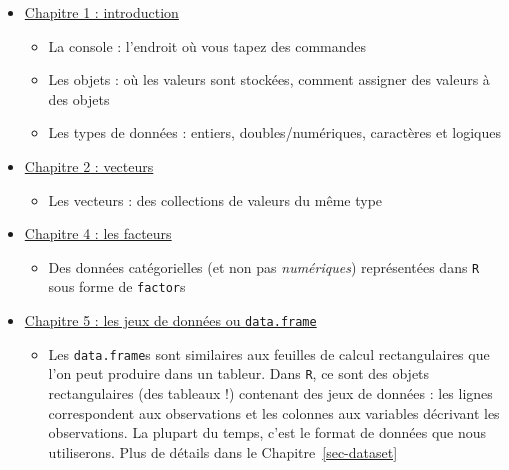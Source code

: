 \documentclass[
  a4paper,
  DIV=11,
  numbers=noendperiod,
  oneside]{scrreprt}
\providecommand{\tightlist}{%
  \setlength{\itemsep}{0pt}\setlength{\parskip}{0pt}}\usepackage{longtable,booktabs,array}
\begin{document}
\begin{itemize}
\tightlist
\item
  \href{https://campus.datacamp.com/courses/introduction-a-r/chapitre-1-introduction?ex=1}{Chapitre
  1 : introduction}

  \begin{itemize}
  \tightlist
  \item
    La console : l'endroit où vous tapez des commandes
  \item
    Les objets : où les valeurs sont stockées, comment assigner des
    valeurs à des objets
  \item
    Les types de données : entiers, doubles/numériques, caractères et
    logiques
  \end{itemize}
\item
  \href{https://campus.datacamp.com/courses/introduction-a-r/chapitre-2-les-vecteurs?ex=1}{Chapitre
  2 : vecteurs}

  \begin{itemize}
  \tightlist
  \item
    Les vecteurs : des collections de valeurs du même type
  \end{itemize}
\item
  \href{https://campus.datacamp.com/courses/introduction-a-r/chapitre-4-facteurs?ex=1}{Chapitre
  4 : les facteurs}

  \begin{itemize}
  \tightlist
  \item
    Des données catégorielles (et non pas \emph{numériques})
    représentées dans \texttt{R} sous forme de \texttt{factor}s
  \end{itemize}
\item
  \href{https://campus.datacamp.com/courses/introduction-a-r/chapitre-5-les-jeux-de-donnees?ex=1}{Chapitre
  5 : les jeux de données ou \texttt{data.frame}}

  \begin{itemize}
  \tightlist
  \item
    Les \texttt{data.frame}s sont similaires aux feuilles de calcul
    rectangulaires que l'on peut produire dans un tableur. Dans
    \texttt{R}, ce sont des objets rectangulaires (des tableaux !)
    contenant des jeux de données : les lignes correspondent aux
    observations et les colonnes aux variables décrivant les
    observations. La plupart du temps, c'est le format de données que
    nous utiliserons. Plus de détails dans le Chapitre~\ref{sec-dataset}
  \end{itemize}
\end{itemize}
\end{document}
